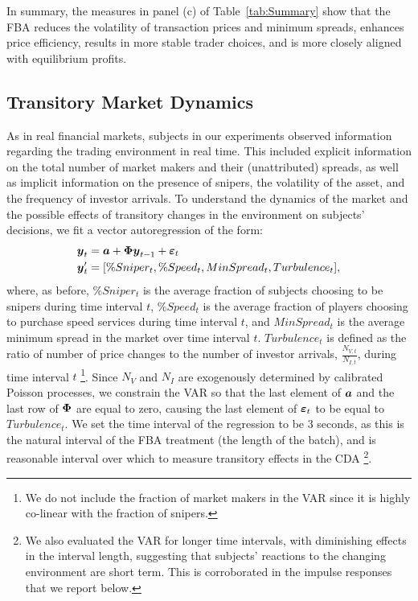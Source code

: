 \documentclass[12pt]{article}
\def\bmath#1{\mbox{\boldmath$#1$}}
\begin{document}
In summary, the measures in panel (c) of Table~\ref{tab:Summary} show that the FBA reduces the volatility of transaction prices and minimum spreads, enhances price efficiency, results in more stable trader choices, and is more closely aligned with equilibrium profits.

\subsection{Transitory Market Dynamics}

As in real financial markets, subjects in our experiments observed information regarding the trading environment in real time. This included explicit information on the total number of market makers and their (unattributed) spreads, as well as implicit information on the presence of snipers, the volatility of the asset, and the frequency of investor arrivals. To understand the dynamics of the market and the possible effects of transitory changes in the environment on subjects' decisions, we fit a vector autoregression of the form:
\begin{align}
	\bmath{y}_t & = \bmath{a} + \bmath{\Phi} \bmath{y}_{t-1} + \bmath{\varepsilon}_t \label{eq:var1} \\
    \bmath{y}_t' & = [\%Sniper_t, \%Speed_t, MinSpread_t, Turbulence_t], \label{eq:var2}
\end{align}
where, as before, $\%Sniper_t$ is the average fraction of subjects choosing to be snipers during time interval $t$, $\%Speed_t$ is the average fraction of players choosing to purchase speed services during time interval $t$, and $MinSpread_t$ is the average minimum spread in the market over time interval $t$. $Turbulence_t$ is defined as the ratio of number of price changes to the number of investor arrivals, $\frac{N_{V,t}}{N_{I,t}} $, during time interval $t$ \footnote{We do not include the fraction of market makers in the VAR since it is highly co-linear with the fraction of snipers.}. Since $N_V$ and $N_I$ are exogenously determined by calibrated Poisson processes, we constrain the VAR so that the last element of $\bmath{a}$ and the last row of $\bmath{\Phi}$ are equal to zero, causing the last element of $\bmath{\varepsilon}_t$ to be equal to $Turbulence_t$.
We set the time interval of the regression to be 3 seconds, as this is the natural interval of the FBA treatment (the length of the batch), and is reasonable interval over which to measure transitory effects in the CDA \footnote{We also evaluated the VAR for longer time intervals, with diminishing effects in the interval length, suggesting that subjects' reactions to the changing environment are short term. This is corroborated in the impulse responses that we report below.}.
\end{document}
